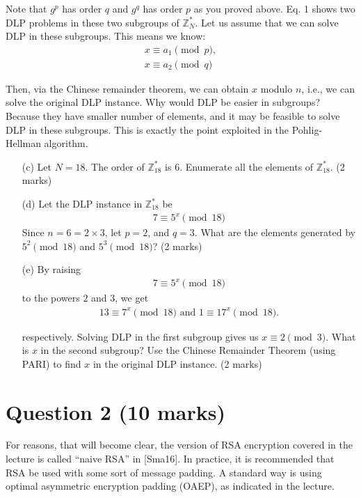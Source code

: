 \documentclass{article}
\begin{document}
Note that $g^p$ has order $q$ and $g^q$ has order $p$ as you proved above. Eq. 1 shows two DLP problems in these two subgroups of $\mathbb{Z}_{N}^{*}$. Let us assume that we can solve DLP in these subgroups. This means we know: 
\begin{align*}
x \equiv a_1 \pmod{p}, \\
x \equiv a_2 \pmod{q}
\end{align*}


Then, via the Chinese remainder theorem, we can obtain $x$ modulo $n$, i.e., we can solve the original DLP instance. Why would DLP be easier in subgroups? Because they have smaller number of elements, and it may be feasible to solve DLP in these subgroups. This is exactly the point exploited in the Pohlig-Hellman algorithm.

\begin{itemize}
    \item[(c)] Let $N = 18$. The order of $\mathbb{Z}_{18}^{*}$ is $6$. Enumerate all the elements of $\mathbb{Z}_{18}^{*}$. (2 marks)
    \item[(d)] Let the DLP instance in $\mathbb{Z}_{18}^{*}$ be 
    \begin{align*}
    7 \equiv 5^x \pmod{18}
    \end{align*}
    Since $n = 6 = 2\times3$, let $p = 2$, and $q = 3$. What are the elements generated by $5^2 \pmod{18}$ and $5^3 \pmod{18}$? (2 marks)
    \item[(e)] By raising 
    \begin{align*}
    7 \equiv 5^x \pmod{18}
    \end{align*}
    to the powers $2$ and $3$, we get
    \begin{align*}
    13 \equiv 7^x \pmod{18}\text{ and } 1\equiv 17^x \pmod{18}.
    \end{align*}
    
    respectively. Solving DLP in the first subgroup gives us $x \equiv 2 \pmod{3}$. What is $x$ in the second subgroup? Use the Chinese Remainder Theorem (using PARI) to find $x$ in the original DLP instance. (2 marks)
\end{itemize}
\section{Question 2 (10 marks)}
For reasons, that will become clear, the version of RSA encryption covered in the lecture is called “naive RSA” in [Sma16]. In practice, it is recommended that RSA be used with some sort of message padding. A standard way is using optimal asymmetric encryption padding (OAEP), as indicated in the lecture. 
\end{document}

